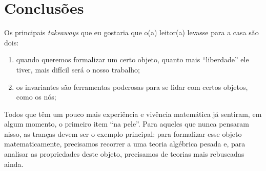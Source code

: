 	\section{Conclusões}
	    Os principais {\it takeaways} que eu gostaria que o(a) leitor(a) levasse para a casa são dois:
	    \begin{enumerate}
	        \item quando queremos formalizar um certo objeto, quanto mais ``liberdade'' ele tiver, mais difícil
	        será o nosso trabalho;
	        \item os invariantes são ferramentas poderosas para se lidar com certos objetos, como os nós;
	    \end{enumerate}
	    \par\vspace{0.3cm} Todos que têm um pouco mais experiência e vivência matemática já sentiram, 
	    em algum momento, o primeiro item ``na pele''. Para aqueles que nunca pensaram nisso, as tranças 
	    devem ser o exemplo principal:
	    para formalizar esse objeto matematicamente, precisamos recorrer a uma teoria algébrica pesada e, 
	    para analisar as propriedades deste objeto, precisamos de teorias mais rebuscadas ainda.
	    
